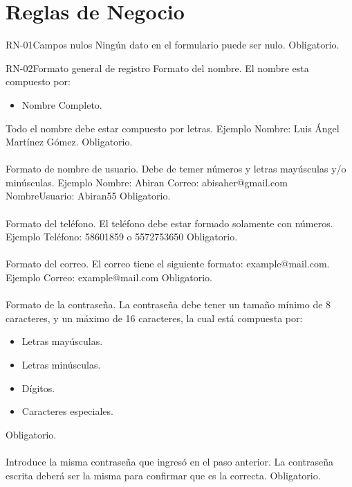 \section{Reglas de Negocio}

\begin{BussinesRule}{RN-01}{Campos nulos}
	\BRitem[Descripción:] Ningún dato en el formulario puede ser nulo.
	\BRitem[Nivel:] Obligatorio.
\end{BussinesRule}

\begin{BussinesRule}{RN-02}{Formato general de registro}
	\BRitem[Nombre:] Formato del nombre.
	\BRitem[Descripción:] El nombre esta compuesto por:
		\begin{itemize}
			\item Nombre Completo.
		\end{itemize}
		Todo el nombre debe estar compuesto por letras.
		Ejemplo 
		Nombre: Luis Ángel Martínez Gómez.
	\BRitem[Nivel:] Obligatorio.\\\\

	\BRitem[Teléfono:] Formato de nombre de usuario.
	\BRitem[Descripción:] Debe de temer números y letras mayúsculas y/o minúsculas.
		Ejemplo
		Nombre: Abiran
		Correo: abisaher@gmail.com
		NombreUsuario: Abiran55
	\BRitem[Nivel:] Obligatorio.\\\\

	\BRitem[Teléfono:] Formato del teléfono.
	\BRitem[Descripción:] El teléfono debe estar formado solamente con números.
		Ejemplo
		Teléfono: 58601859 o 5572753650
	\BRitem[Nivel:] Obligatorio.\\\\

	\BRitem[Teléfono:] Formato del correo.
	\BRitem[Descripción:] El correo tiene el siguiente formato: example@mail.com.
		Ejemplo
		Correo: example@mail.com
	\BRitem[Nivel:] Obligatorio.\\\\

	\BRitem[Contraseña:] Formato de la contraseña.
	\BRitem[Descripción:] La contraseña debe tener un tamaño mínimo de 8 caracteres, y un máximo de 16 caracteres, la cual está compuesta por:
		\begin{itemize}
			\item Letras mayúsculas.
			\item Letras minúsculas.
			\item Dígitos.
			\item Caracteres especiales.
		\end{itemize}
	\BRitem[Nivel:] Obligatorio.\\\\

	 Introduce la misma contraseña que ingresó en el paso anterior.
	\BRitem[Descripción:] La contraseña escrita deberá ser la misma para confirmar que es la correcta.
	\BRitem[Nivel:] Obligatorio.\\\\
\end{BussinesRule}

